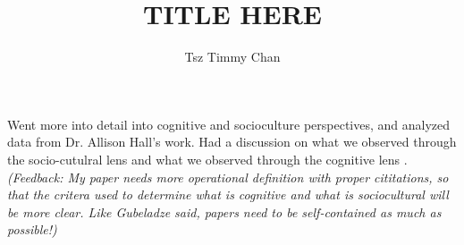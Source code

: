 \documentclass{TC}
\title{TITLE HERE}	%
\author{Tsz Timmy Chan}	%
\begin{document}
Went more into detail into cognitive and socioculture perspectives, and analyzed data from Dr. Allison Hall's work. Had a discussion on what we observed through the socio-cutulral lens and what we observed through the cognitive lens \parencite{j._pellegrino_perspectives_2012}.
\textit{(Feedback: My paper needs more operational definition with proper cititations, so that the critera used to determine what is cognitive and what is sociocultural will be more clear. Like Gubeladze said, papers need to be self-contained as much as possible!)}
\end{document}
